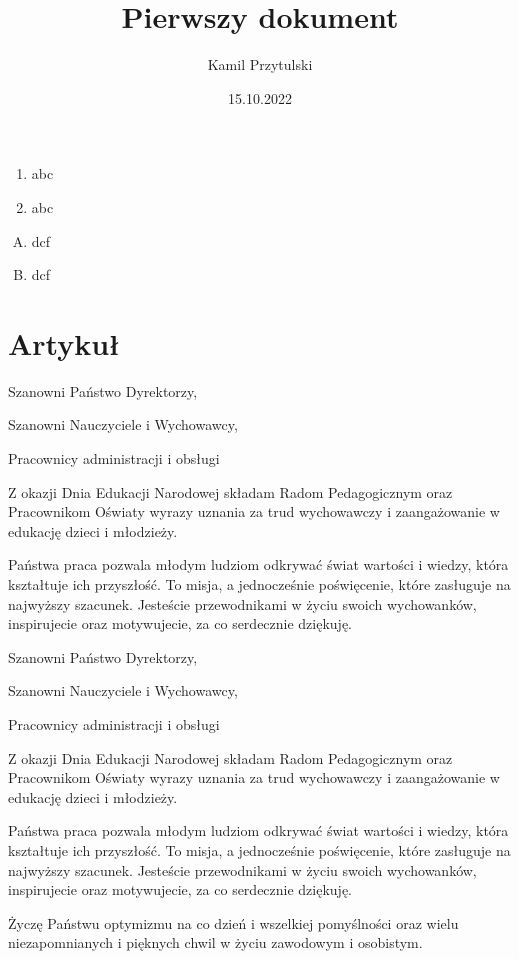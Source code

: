 \documentclass[12pt, letterpaper, titlepage]{article}
\title{Pierwszy dokument }
\author{Kamil Przytulski}
\date{15.10.2022}
\begin{document}
\maketitle

\newpage


\begin{enumerate}
\item abc
\item abc
\end{enumerate}

\begin{enumerate}[A.]
\item dcf
\item dcf
\end{enumerate}


\section{Artykuł}
Szanowni Państwo Dyrektorzy,

Szanowni Nauczyciele i Wychowawcy,

Pracownicy administracji i obsługi

Z okazji Dnia Edukacji Narodowej składam Radom Pedagogicznym oraz Pracownikom Oświaty wyrazy uznania za trud wychowawczy i zaangażowanie w edukację dzieci i młodzieży.

Państwa praca pozwala młodym ludziom odkrywać świat wartości i wiedzy, która kształtuje ich przyszłość. To misja, a jednocześnie poświęcenie, które zasługuje na najwyższy szacunek. Jesteście przewodnikami w życiu swoich wychowanków, inspirujecie oraz motywujecie, za co serdecznie dziękuję.



\newpage 

Szanowni Państwo Dyrektorzy,

Szanowni Nauczyciele i Wychowawcy,

Pracownicy administracji i obsługi

Z okazji Dnia Edukacji Narodowej składam Radom Pedagogicznym oraz Pracownikom Oświaty wyrazy uznania za trud wychowawczy i zaangażowanie w edukację dzieci i młodzieży.

Państwa praca pozwala młodym ludziom odkrywać świat wartości i wiedzy, która kształtuje ich przyszłość. To misja, a jednocześnie poświęcenie, które zasługuje na najwyższy szacunek. Jesteście przewodnikami w życiu swoich wychowanków, inspirujecie oraz motywujecie, za co serdecznie dziękuję.

Życzę Państwu optymizmu na co dzień i wszelkiej pomyślności oraz wielu niezapomnianych i pięknych chwil w życiu zawodowym i osobistym.
\end{document}

